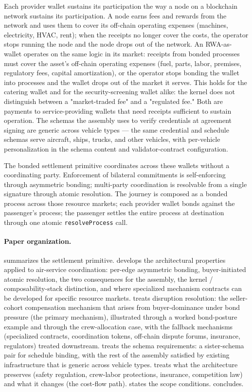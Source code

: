 \documentclass[11pt,a4paper]{article}
\theoremstyle{definition}
\theoremstyle{remark}
\begin{document}
Each provider wallet sustains its participation the way a node
on a blockchain network sustains its participation. A node earns
fees and rewards from the network and uses them to cover its
off-chain operating expenses (machines, electricity, HVAC, rent);
when the receipts no longer cover the costs, the operator stops
running the node and the node drops out of the network. An
RWA-as-wallet operates on the same logic in its market: receipts
from bonded processes must cover the asset's off-chain operating
expenses (fuel, parts, labor, premises, regulatory fees, capital
amortization), or the operator stops bonding the wallet into
processes and the wallet drops out of the market it serves. This
holds for the catering wallet and for the security-screening
wallet alike: the kernel does not distinguish between a
"market-traded fee" and a "regulated fee." Both are payments to
service-providing wallets that need receipts sufficient to
sustain operation. The schemas the assembly uses to verify
credentials at agreement signing are generic across vehicle types
--- the same credential and schedule schemas serve aircraft,
ships, trucks, and other vehicles, with per-vehicle personalization
in the schema content and validator-contract configuration.

The bonded settlement primitive coordinates across these wallets
without a coordinating party. Enforcement of bilateral commitments
is self-enforcing through asymmetric bonding; multi-party
coordination is resolvable from a single signature through atomic
resolution. The journey is composed as a bonded process across
those resource markets; each provider wallet bonds against the
passenger's process; the passenger settles the entire process at
destination through one atomic \texttt{resolveProcess} call.

\paragraph{Paper organization.}
 summarizes the settlement primitive.
 develops the architectural properties applied
to air-service coordination: per-edge asymmetric bonding,
buyer-initiated atomic resolution, the two consequences for the
assembly, the kernel / composability-stack distinction, and where
specialized mechanism contracts can be developed for specific
resource markets.  treats disruption
resolution: the seller-cohort compensation mechanism that arises
from buyer-dominance under bond pressure (the primary mechanism),
illustrated through a worked bond-posture example and through the
crew-allocation case, with the fallback mechanisms (specialized
contracts, coordination tokens, off-chain dispute forums,
insurance, regulators) treated downstream. 
treats the schema requirements: a sister-schema pair for
schedule binding, with the rest of the assembly satisfied by
existing infrastructure that is generic across vehicle types.
 treats what the architecture preserves
(safety regulation, crew-labor protections, insurance,
competition law) and what it changes (the cost-flow path).
 states the scope conditions.
 concludes.
\end{document}
